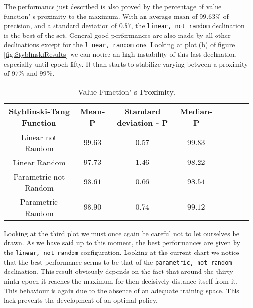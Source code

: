 The performance just described is also proved by the percentage of value function' s proximity to the maximum. With an average mean of $99.63\%$ of precision, and a standard deviation of $0.57$, the {\tt linear, not random} declination is the best of the set. General good performances are also made by all other declinations except for the {\tt linear, random} one. Looking at plot (b) of figure \ref{fig:StyblinskiResults} we can notice an high instability of this last declination especially until epoch fifty. It than starts to stabilize varying between a proximity of $97\%$ and $99\%$.

\begin{table}[h!]
	\centering
	\resizebox{\linewidth}{!} {
		\begin{tabular}{c| ccccccc} 
			\hline \textbf{Styblinski-Tang Function}
			& \textbf{Mean- P} & \textbf{Standard deviation - P}  &\textbf{Median- P} \\ 
			\hline Linear not Random
			& \cellcolor{green!25}$99.63$ & \cellcolor{green!25}$0.57$ & \cellcolor{green!25}$99.83$  \\ 
			\hline Linear Random
			& $97.73$ & $1.46$ & $98.22$ \\ 
			\hline Parametric not Random
			& $98.61$ & $0.66$ & $98.54$ \\ 
			\hline Parametric Random
			& $98.90$ & $0.74$ & $99.12$ \\ 
			\hline 
		\end{tabular} 
	}
	\label{StyblinskiTabProximity}
	\caption{Value Function' s Proximity.} 
\end{table}

Looking at the third plot we must once again be careful not to let ourselves be drawn. As we have said up to this moment, the best performances are given by the {\tt linear, not random} configuration. Looking at the current chart we notice that the best performance seems to be that of the {\tt parametric, not random} declination. This result obviously depends on the fact that around the thirty-ninth epoch it reaches the maximum for then decisively distance itself from it. This behaviour is again due to the absence of an adequate training space. This lack prevents the development of an optimal policy.